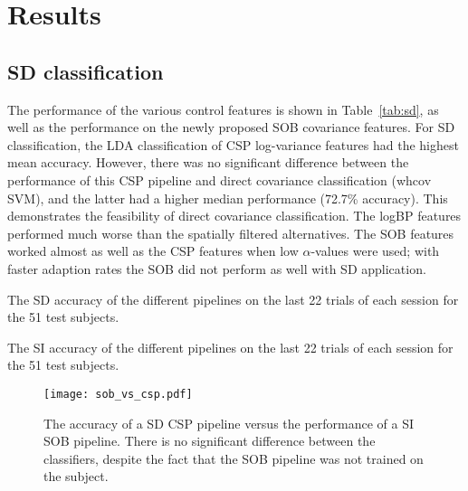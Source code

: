 \section{Results}
\subsection{\protect\Acl{SD} classification}

The performance of the various control features is shown in
Table~\ref{tab:sd}, as well as the performance on the newly proposed \ac{SOB}
covariance features. For \acf{SD} classification, the \ac{LDA} classification of
\ac{CSP} log-variance features had the highest mean accuracy. However, there was
no significant difference between the performance of this \ac{CSP} pipeline and
direct covariance classification (whcov \ac{SVM}), and the latter had a higher
median performance (72.7\% accuracy). This demonstrates the feasibility of
direct covariance classification.
%
The \ac{logBP} features performed much worse than the spatially filtered
alternatives.
%
The \ac{SOB} features worked almost as well as the \ac{CSP} features when low
$\alpha$-values were used; with faster adaption rates the \ac{SOB} did not
perform as well with \ac{SD} application.

\begin{table}
  \caption{The \protect\acl{SD} accuracy of the different pipelines on the
  last 22 trials of each session for the 51 test subjects.}
  \center \label{tab:sd}
  
\end{table}

\begin{table}
  \caption{The \protect\acl{SI} accuracy of the different pipelines on the last
  22 trials of each session for the 51 test subjects.}
  \center \label{tab:si}
  
\end{table}

\begin{figure}
  \center \texttt{[image: sob\_vs\_csp.pdf]} 
  \caption{The accuracy of a \protect\acl{SD} \protect\ac{CSP} pipeline versus
  the performance of a \protect\acl{SI} \protect\ac{SOB} pipeline. There is no
  significant difference between the classifiers, despite the fact that the
  \protect\ac{SOB} pipeline was not trained on the subject.}
  \label{fig:csp_vs_sob}
\end{figure}


